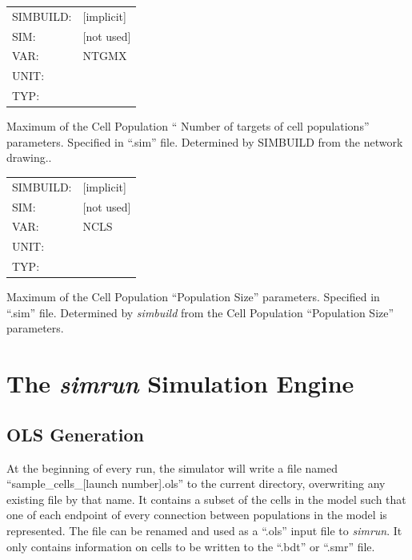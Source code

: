 \documentclass[12pt,openany,oneside]{book}
\newcommand{\prog}[1]{\textit{{#1}}}
\newcommand{\ext}[1]{{{``.#1''}}}
\newcommand{\inquotes}[1]{{{``#1''}}}
\begin{document}
\begin{flushleft}
\begin{tabular}{@{}ll@{}}
SIMBUILD: & [implicit]\\
SIM: & [not used]\\
VAR: & NTGMX\\
UNIT: &\\
TYP: &\\
\end{tabular}
\end{flushleft}
\noindent
Maximum of the Cell Population \inquotes{ Number of targets of cell
populations} parameters. Specified in \ext{sim} file. Determined by
SIMBUILD from the network drawing..
\filbreak
\vspace{\baselineskip}

\begin{flushleft}
\begin{tabular}{@{}ll@{}}
SIMBUILD: & [implicit]\\
SIM: & [not used]\\
VAR: & NCLS\\
UNIT: &\\
TYP: &\\
\end{tabular}
\end{flushleft}
\noindent
Maximum of the Cell Population \inquotes{Population Size} parameters.
Specified in \ext{sim} file. Determined by \prog{simbuild} from the Cell
Population \inquotes{Population Size} parameters.
\filbreak
\vspace{\baselineskip}


\section{The \prog{simrun} Simulation Engine}


\subsection{OLS Generation} 
At the beginning of every run, the simulator will write a file named
\inquotes{sample\_cells\_[launch number].ols} to the current directory, overwriting any
existing file by that name. It contains a subset of the cells in the
model such that one of each endpoint of every connection between
populations in the model is represented. The file can be renamed and
used as a \inquotes{.ols} input file to \prog{simrun}.
It only contains information on
cells to be written to the 
\ext{bdt} or \ext{smr} file.
\end{document}
